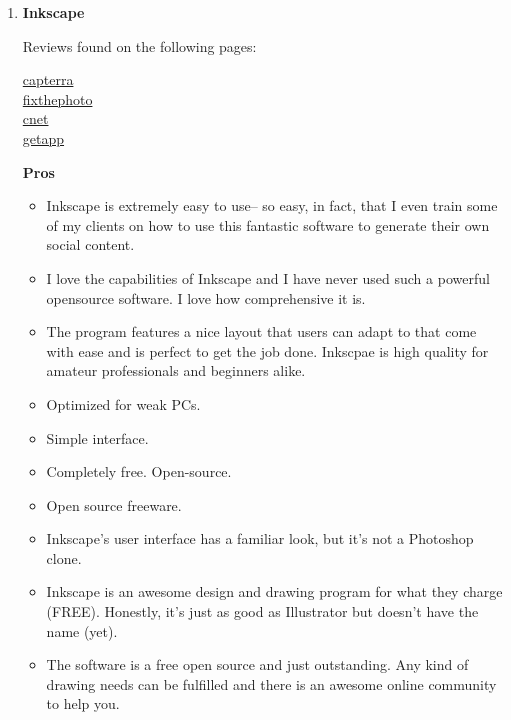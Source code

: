\documentclass[a4paper,12pt]{article}
\begin{document}
\begin{enumerate}
\item \textbf{Inkscape}

  \vspace{0.1cm}
  Reviews found on the following pages:
  \begin{center}
    \href{https://www.capterra.com/p/178240/Inkscape/}{capterra}\\
    \href{https://fixthephoto.com/inkscape-review.html}{fixthephoto}\\
    \href{https://download.cnet.com/Inkscape/3000-2191_4-10527269.html}{cnet}\\
    \href{https://www.getapp.com/collaboration-software/a/inkscape-business-graphics-software/reviews/}{getapp}\\
  \end{center}

  \textbf{Pros}
  \begin{itemize}
  \item Inkscape is extremely easy to use-- so easy, in fact, that I even train some of my clients on how to use this fantastic software to generate their own social content.
  \item I love the capabilities of Inkscape and I have never used such a powerful opensource software. I love how comprehensive it is.
  \item The program features a nice layout that users can adapt to that come with ease and is perfect to get the job done. Inkscpae is high quality for amateur professionals and beginners alike.
  \item Optimized for weak PCs.
  \item Simple interface.
  \item Completely free. Open-source.
  \item Open source freeware.
  \item Inkscape's user interface has a familiar look, but it's not a Photoshop clone.
  \item Inkscape is an awesome design and drawing program for what they charge (FREE). Honestly, it's just as good as Illustrator but doesn't have the name (yet).
  \item The software is a free open source and just outstanding. Any kind of drawing needs can be fulfilled and there is an awesome online community to help you.
  \end{itemize}
  

\end{enumerate}
\end{document}
